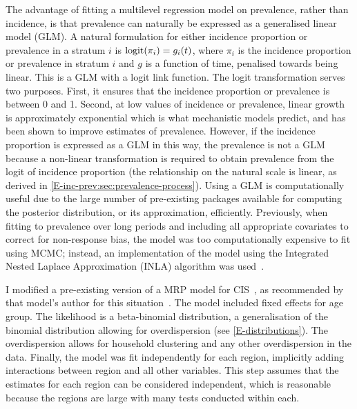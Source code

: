 \documentclass[thesis.tex]{subfiles}
\begin{document}
The advantage of fitting a multilevel regression model on prevalence, rather than incidence, is that prevalence can naturally be expressed as a generalised linear model (GLM).
A natural formulation for either incidence proportion or prevalence in a stratum $i$ is $\operatorname{logit}(\pi_i) = g_i(t)$, where $\pi_i$ is the incidence proportion or prevalence in stratum $i$ and $g$ is a function of time, penalised towards being linear.
This is a GLM with a logit link function.
The logit transformation serves two purposes.
First, it ensures that the incidence proportion or prevalence is between 0 and 1.
Second, at low values of incidence or prevalence, linear growth is approximately exponential which is what mechanistic models predict, and has been shown to improve estimates of prevalence.
However, if the incidence proportion is expressed as a GLM in this way, the prevalence is not a GLM because a non-linear transformation is required to obtain prevalence from the logit of incidence proportion (the relationship on the natural scale is linear, as derived in \cref{E-inc-prev:sec:prevalence-process}).
Using a GLM is computationally useful due to the large number of pre-existing packages available for computing the posterior distribution, or its approximation, efficiently.
Previously, when fitting to prevalence over long periods and including all appropriate covariates to correct for non-response bias, the model was too computationally expensive to fit using MCMC; instead, an implementation of the model using the Integrated Nested Laplace Approximation (INLA) algorithm was used~.

I modified a pre-existing version of a MRP model for CIS~\autocite{pouwelsMRPvaccination}, as recommended by that model's author for this situation~.
The model included fixed effects for age group.
The likelihood is a beta-binomial distribution, a generalisation of the binomial distribution allowing for overdispersion (see \cref{E-distributions}).
The overdispersion allows for household clustering and any other overdispersion in the data. 
Finally, the model was fit independently for each region, implicitly adding interactions between region and all other variables.
This step assumes that the estimates for each region can be considered independent, which is reasonable because the regions are large with many tests conducted within each.
\end{document}
